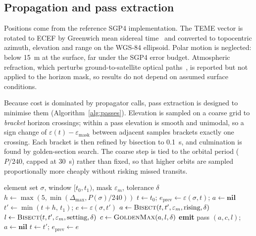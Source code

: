 \documentclass[conference]{IEEEtran}
\begin{document}
\subsection{Propagation and pass extraction}
Positions come from the reference SGP4 implementation. The TEME vector is rotated
to ECEF by Greenwich mean sidereal time~\cite{vallado2022fundamentals} and converted to
topocentric azimuth, elevation and range on the WGS-84 ellipsoid. Polar motion is
neglected: below \SI{15}{\metre} at the surface, far under the SGP4 error budget.
Atmospheric refraction, which perturbs ground-to-satellite optical
paths~\cite{stuhl2021refraction}, is reported but not applied to the horizon
mask, so results do not depend on assumed surface conditions.

Because cost is dominated by propagator calls, pass extraction is designed to
minimise them (Algorithm~\ref{alg:passes}). Elevation is sampled on a coarse grid
to \emph{bracket} horizon crossings; within a pass elevation is smooth and
unimodal, so a sign change of $\varepsilon(t) - \varepsilon_\mathrm{mask}$
between adjacent samples brackets exactly one crossing. Each bracket is then
refined by bisection to \SI{0.1}{\second}, and culmination is found by
golden-section search. The coarse step is tied to the orbital period
($P/240$, capped at \SI{30}{\second}) rather than fixed, so that higher orbits
are sampled proportionally more cheaply without risking missed transits.

\begin{algorithm}[t]
\caption{Pass extraction for one object}
\label{alg:passes}
\begin{algorithmic}[1]
\Require element set $\sigma$, window $[t_0,t_1)$, mask $\varepsilon_m$,
         tolerance $\delta$
\State $h \gets \max(5,\min(\Delta_\mathrm{max}, P(\sigma)/240))$
\State $t \gets t_0$; \; $e_\mathrm{prev} \gets \varepsilon(\sigma,t)$;
       \; $a \gets \textbf{nil}$
  \State $t' \gets \min(t+h,\,t_1)$; \; $e \gets \varepsilon(\sigma,t')$
     \State $a \gets \textsc{Bisect}(t,t',\varepsilon_m,\text{rising},\delta)$
     \State $l \gets \textsc{Bisect}(t,t',\varepsilon_m,\text{setting},\delta)$
     \State $c \gets \textsc{GoldenMax}(a,l,\delta)$
     \State \textbf{emit} pass $(a,c,l)$; \; $a \gets \textbf{nil}$
  \EndIf
  \State $t \gets t'$; \; $e_\mathrm{prev} \gets e$
\EndWhile
\end{algorithmic}
\end{algorithm}
\end{document}
